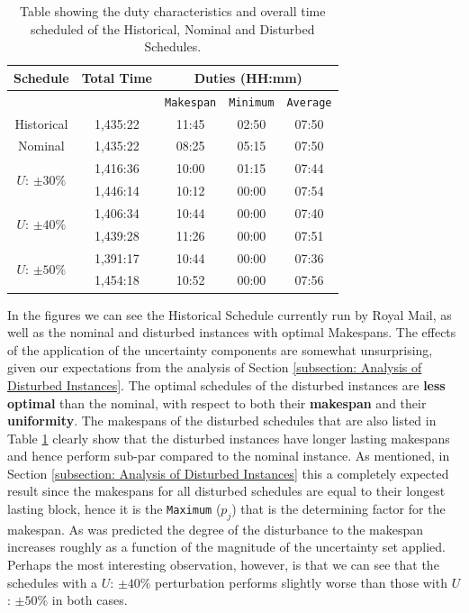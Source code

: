 \begin{table}[b]
\small
    \centering 
    \begin{tabular}{|c|c|c|c|c|}
        \hline
        \textbf{Schedule} & \textbf{Total Time} & \multicolumn{3}{|c|}{ \textbf{Duties (HH:mm)}} \\
        \hline
        \multicolumn{2}{|c|}{ }  & \texttt{Makespan} & \texttt{Minimum} & \texttt{Average}  \\
        \hline
        Historical & 1,435:22 & 11:45 & 02:50 & 07:50 \\
        \hline
        Nominal & 1,435:22 & 08:25 & 05:15 & 07:50 \\
        \hline
        \multirow{2}{*}{$U$: $\pm30\%$} &1,416:36 & 10:00 & 01:15 & 07:44 \\
        \cline{2-5}
         & 1,446:14 & 10:12 & 00:00 & 07:54  \\
        \hline
        \multirow{2}{*}{$U$: $\pm40\%$} & 1,406:34 & 10:44 & 00:00 & 07:40  \\
        \cline{2-5}
         & 1,439:28 & 11:26 & 00:00 & 07:51 \\
        \hline
        \multirow{2}{*}{$U$: $\pm50\%$} & 1,391:17 & 10:44 & 00:00 & 07:36  \\
        \cline{2-5}
         & 1,454:18 & 10:52 & 00:00 & 07:56  \\
        \hline
    \end{tabular}%
    \medbreak
    \caption{Table showing the duty characteristics and overall time scheduled of the Historical, Nominal and Disturbed Schedules.}
    \label{table:Uncertainty Schedules}
\end{table}


\vspace{\baselineskip}
\noindent
In the figures we can see the Historical Schedule currently run by Royal Mail, as well as the nominal and disturbed instances with optimal Makespans. The effects of the application of the uncertainty components are somewhat unsurprising, given our expectations from the analysis of Section \ref{subsection: Analysis of  Disturbed Instances}. The optimal schedules of the disturbed instances are \textbf{less optimal} than the nominal, with respect to both their \textbf{makespan} and their \textbf{uniformity}. The makespans of the disturbed schedules that are also listed in Table \ref{table:Uncertainty Schedules} clearly show that the disturbed instances have longer lasting makespans and hence perform sub-par compared to the nominal instance. As mentioned, in Section \ref{subsection: Analysis of  Disturbed Instances} this a completely expected result since the makespans for all disturbed schedules are equal to their longest lasting block, hence it is the \texttt{Maximum} ($p_j$) that is the determining factor for the makespan. As was predicted the degree of the disturbance to the makespan increases roughly as a function of the magnitude of the uncertainty set applied. Perhaps the most interesting observation, however, is that we can see that the schedules with a $U$: $\pm40\%$ perturbation performs slightly worse than those with $U$: $\pm50\%$ in both cases.

